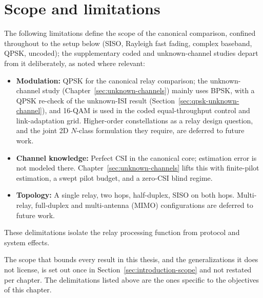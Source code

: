 \section{Scope and limitations}\label{sec:scope-and-delimitations}

The following limitations define the scope of the canonical comparison, confined throughout to the setup below (SISO, Rayleigh fast fading, complex baseband, QPSK, uncoded); the supplementary coded and unknown-channel studies depart from it deliberately, as noted where relevant:

\begin{itemize}
\tightlist
\item
  \textbf{Modulation:} QPSK for the canonical relay comparison; the unknown-channel study (Chapter~\ref{sec:unknown-channels}) mainly uses BPSK, with a QPSK re-check of the unknown-ISI result (Section~\ref{sec:qpsk-unknown-channel}), and 16-QAM is used in the coded equal-throughput control and link-adaptation grid. Higher-order constellations as a relay design question, and the joint 2D $N$-class formulation they require, are deferred to future work.
\item
  \textbf{Channel knowledge:} Perfect CSI in the canonical core; estimation error is not modeled there. Chapter~\ref{sec:unknown-channels} lifts this with finite-pilot estimation, a swept pilot budget, and a zero-CSI blind regime.

\item
  \textbf{Topology:} A single relay, two hops, half-duplex, SISO on both hops. Multi-relay, full-duplex and multi-antenna (MIMO) configurations are deferred to future work.
\end{itemize}

These delimitations isolate the relay processing function from protocol and system effects.

The scope that bounds every result in this thesis, and the generalizations it does not
license, is set out once in Section~\ref{sec:introduction-scope} and not restated per chapter.
The delimitations listed above are the ones specific to the objectives of this chapter.
